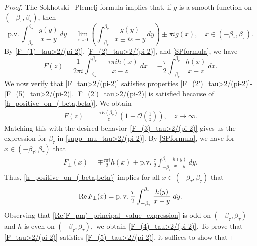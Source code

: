 \documentclass[reqno,11pt]{amsart}
\theoremstyle{plain}
\theoremstyle{definition}
\theoremstyle{remark}
\numberwithin{equation}{section}
\renewcommand{\Re}{\mathop{\rm Re}}
\begin{document}
\begin{proof}
The Sokhotski–-Plemelj formula implies that, if $g$ is a smooth function on $(-\beta_\tau, \beta_\tau)$, then
\begin{equation}
    \label{SPformula}
    \text{p.v.}\, \int_{-\beta_\tau}^{\beta_\tau} \frac{g(y)}{x-y}\, dy = \lim_{\varepsilon\downarrow 0}\left(\int_{-\beta_\tau}^{\beta_\tau} \frac{g(y)}{x\pm i\varepsilon-y}\, dy\right) \pm \pi i g(x), \quad x\in ( -\beta_\tau, \beta_\tau).
\end{equation}
  By \eqref{F_(1)_tau>2/(pi-2)}, \eqref{F_(2)_tau>2/(pi-2)}, and \eqref{SPformula}, we have
    \begin{equation}\label{F_tau>2/(pi-2)}
        F(z)=\frac{1}{2\pi i}\int_{-\beta_\tau}^{\beta_\tau}\frac{-\tau\pi ih(x)}{x-z}\ dx=-\frac{\tau}{2}\int_{-\beta_\tau}^{\beta_\tau}\frac{h(x)}{x-z}\ dx.
    \end{equation}
    \indent We now verify that \eqref{F_tau>2/(pi-2)} satisfies properties \eqref{F_(2')_tau>2/(pi-2)}-\eqref{F_(5)_tau>2/(pi-2)}. \eqref{F_(2')_tau>2/(pi-2)} is satisfied because of \eqref{h_positive_on_(-beta,beta)}. We obtain
    \begin{equation*}\label{f_tau>2/(pi-2)_Infinity_Property_Work_1}
    \begin{split}
        F(z)&=\frac{\tau E(\beta_\tau)}{z}\left(1+\mathcal{O}\left(\frac{1}{z}\right)\right),\quad z\to\infty.
    \end{split}
    \end{equation*}
    Matching this with the desired behavior \eqref{F_(3)_tau>2/(pi-2)} gives us the expression for $\beta_\tau$ in \eqref{supp_mu_tau>2/(pi-2)}.\newline
    \indent By \eqref{SPformula}, we have for $x\in(-\beta_\tau,\beta_\tau)$ that
    \begin{align*}
        F_\pm(x)=\mp\frac{\tau\pi i}{2}h(x)+\text{p.v.}\ \frac{\tau}{2}\int_{-\beta_\tau}^{\beta_\tau}\frac{h(y)}{x-y}\ dy.
    \end{align*}
    Thus, \eqref{h_positive_on_(-beta,beta)} implies for all $x\in(-\beta_\tau,\beta_\tau)$ that
\begin{equation}\label{Re(F_pm)_principal_value_expression}
        \Re F_\pm(x)=\operatorname{p.v.}\frac{\tau}{2}\int_{-\beta_\tau}^{\beta_\tau}\frac{h(y)}{x-y}\ dy.
    \end{equation}
    Observing that
    \eqref{Re(F_pm)_principal_value_expression} is odd on $(-\beta_\tau,\beta_\tau)$ and $h$ is even on $(-\beta_\tau,\beta_\tau),$ we obtain \eqref{F_(4)_tau>2/(pi-2)}. 
    To prove that \eqref{F_tau>2/(pi-2)} satisfies \eqref{F_(5)_tau>2/(pi-2)}, it suffices to show that

\end{proof}
\end{document}
